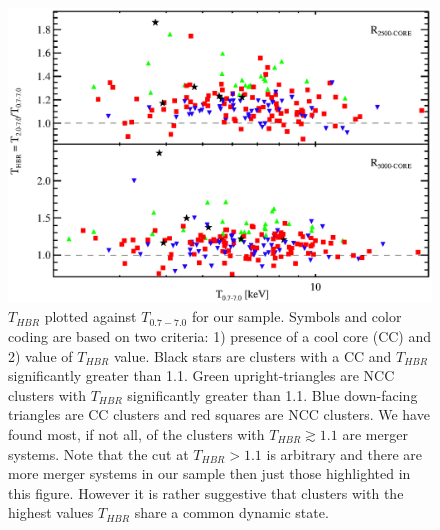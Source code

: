\clearpage
\begin{figure}[htp]
\begin{center}
\includegraphics[scale=1.0]{ftx_tx_color}
\caption{\small
$T_{HBR}$ plotted against $T_{0.7-7.0}$ for our sample. Symbols and
color coding are based on two criteria: 1) presence of a cool core
(CC) and 2) value of $T_{HBR}$ value. Black stars are clusters with a
CC and $T_{HBR}$ significantly greater than 1.1. Green
upright-triangles are NCC clusters with $T_{HBR}$ significantly
greater than 1.1. Blue down-facing triangles are CC clusters and red
squares are NCC clusters. We have found most, if not all, of the
clusters with $T_{HBR} \gtrsim 1.1$ are merger systems. Note that the
cut at $T_{HBR} > 1.1$ is arbitrary and there are more merger systems
in our sample then just those highlighted in this figure. However it
is rather suggestive that clusters with the highest values $T_{HBR}$
share a common dynamic state.
}
\label{fig:ftx_tx}
\end{center}
\end{figure}
